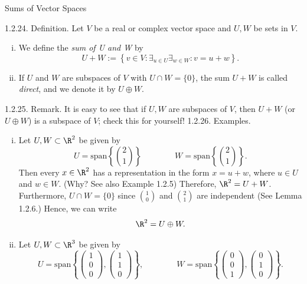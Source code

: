 \documentclass[smaller,hyperref={CJKbookmarks=true}]{beamer}
\begin{document}
\begin{frame}{Sums of Vector Spaces} \begin{spacing}{1.1}
\alert{1.2.24. Definition.} Let $V$ be a real or complex vector space and $U,W$ be sets in $V$.
\begin{enumerate}[(i)]
  \item We define the \emph{sum of U and W} by
      \[U+W:=\left\{v\in V:\mathop{\exists}_{u\in U}\mathop{\exists}_{w\in W}: v=u+w\right\}.\]
  \item If $U$ and $W$ are subspaces of $V$ with $U\cap W=\{0\}$, the sum $U+W$ is called \emph{direct}, and we denote it by $U\oplus W$.
\end{enumerate} \vspace*{12pt}
\alert{1.2.25. Remark.} It is easy to see that if $U,W$ are subspaces of $V$, then $U+W$ (or $U\oplus W$) is a subspace of $V$; check this for yourself!
\newpage
\alert{1.2.26. Examples.}\\
\begin{enumerate}[(i)]
  \item Let $U,W\subset\R^2$ be given by
      \[U=\text{span}\left\{\binom{2}{1}\right\}\qquad\qquad W=\text{span}\left\{\binom{2}{1}\right\}.\]
      Then every $x\in\R^2$ has a representation in the form $x=u+w$, where $u\in U$ and $w\in W$. (Why? See also Example 1.2.5) Therefore, $\R^2=U+W$.\\[11pt]
      Furthermore, $U\cap W=\{0\}$ since $\binom{1}{0}$ and $\binom{2}{1}$ are independent (See Lemma 1.2.6.) Hence, we can write
      \[\R^2=U\oplus W.\] \newpage
  \item Let $U,W\subset\R^3$ be given by
      \[U=\text{span}\left\{\begin{pmatrix}
      1 \\0 \\ 0\end{pmatrix},\begin{pmatrix}
      1 \\1 \\0\end{pmatrix}\right\},\qquad\qquad W=\text{span}\left\{\begin{pmatrix}
      0 \\0 \\1\end{pmatrix},\begin{pmatrix}
      0 \\1 \\0\end{pmatrix}\right\}.\]

\end{enumerate}
\end{spacing}
\end{frame}
\end{document}
